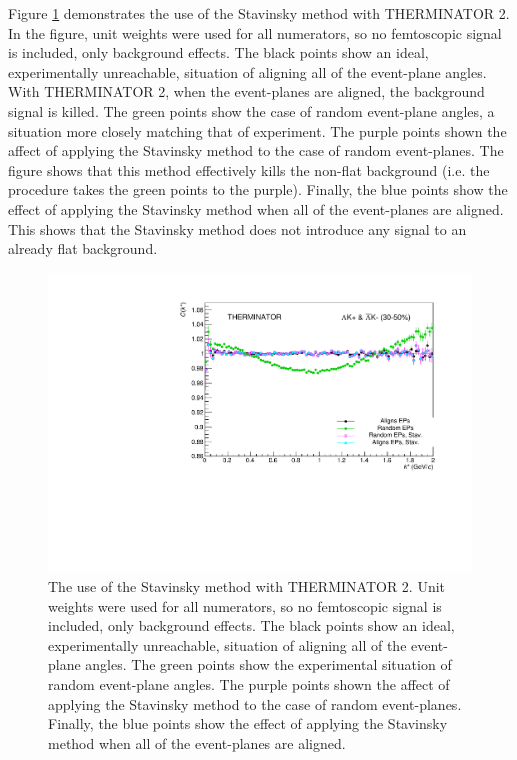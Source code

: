 \documentclass[../AnalysisNoteJBuxton.tex]{subfiles}
\begin{document}
Figure \ref{fig:BgdRedMethodsTHERM} demonstrates the use of the Stavinsky method with THERMINATOR 2.  In the figure, unit weights were used for all numerators, so no femtoscopic signal is included, only background effects.  The black points show an ideal, experimentally unreachable, situation of aligning all of the event-plane angles.  With THERMINATOR 2, when the event-planes are aligned, the background signal is killed.  The green points show the case of random event-plane angles, a situation more closely matching that of experiment.  The purple points shown the affect of applying the Stavinsky method to the case of random event-planes.  The figure shows that this method effectively kills the non-flat background (i.e. the procedure takes the green points to the purple).  Finally, the blue points show the effect of applying the Stavinsky method when all of the event-planes are aligned.  This shows that the Stavinsky method does not introduce any signal to an already flat background.


\begin{figure}[h]
  \centering
  \includegraphics[width=\textwidth]{5_Fitting/Figures/CompareBackgroundReductionMethods_Full_LamKchPwConj_3050_NumWeight1.pdf}
  \caption[Background reduction methods with THERMINATOR]{The use of the Stavinsky method with THERMINATOR 2.  Unit weights were used for all numerators, so no femtoscopic signal is included, only background effects.  The black points show an ideal, experimentally unreachable, situation of aligning all of the event-plane angles.  The green points show the experimental situation of random event-plane angles.  The purple points shown the affect of applying the Stavinsky method to the case of random event-planes.  Finally, the blue points show the effect of applying the Stavinsky method when all of the event-planes are aligned.}
  \label{fig:BgdRedMethodsTHERM}
\end{figure}
\end{document}
